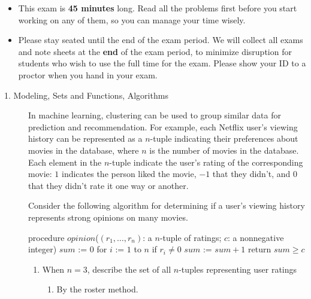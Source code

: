 \documentclass[12pt, oneside]{article}
\newif \ifsolution
\newcommand{\sol}[1]{\medskip\fbox{\begin{minipage}{5.5in}{#1}\end{minipage}}\medskip}
\begin{document}
\begin{center}
\begin{minipage}[t]{7in}
\begin{itemize}
  \item This exam is {\bf 45 minutes} long. Read all the problems first before you start 
  working on any of them, so you can manage your time wisely.
  
  \item Please stay seated until the end of the exam period.
  We will collect all exams and note sheets at the {\bf end} of the exam period, to minimize disruption 
  for students who wish to use the full time for the exam. Please show your ID to a proctor when you hand 
  in your exam. 
  
  
  \end{itemize}
  \end{minipage} \hfill
  \end{center}
  \newpage
\fi

\begin{description}

\item[1. Modeling, Sets and Functions, Algorithms] 
In machine learning, clustering can be used to group similar data for prediction and recommendation.  For example,
each Netflix user's viewing history can be represented as a $n$-tuple indicating their preferences about
movies in the database, where $n$ is the number of movies in the database.  Each element in the $n$-tuple indicate
the user's rating of the corresponding movie: 
$1$ indicates the person liked the movie, $-1$
that they didn't, and $0$ that they didn't rate it one way or another.

Consider the following algorithm for determining if a user's viewing history represents
strong opinions on many movies.
\begin{algorithm}[caption={Determine if user's ratings tuple encode strong opinions}]
procedure $\textit{opinion}$($(r_1, \ldots, r_n)$: a $n$-tuple of ratings; $c$: a nonnegative integer)
$sum$ := $0$
for $i$ := $1$ to $n$
  if $r_i \neq 0$
    $sum$ := $sum + 1$
return $sum \geq c$
\end{algorithm}

  \begin{enumerate}\item When $n = 3$, describe the set of all $n$-tuples representing user ratings
  \begin{enumerate}\item By the roster method.
  
  \ifsolution{
  \sol{There are 27 $3$-tuples whose elements are each $-1$, $0$, or $1$.  We can list them as follows.
  \begin{align*}
  \{ & (-1, -1, -1) , (-1, -1, 0) , (-1, -1, 1) , (-1, 0, -1), (-1, 0, 0), (-1, 0, 1),\\
     & (-1, 1, -1), (-1, 1, 0), (-1, 1, 1), (0, -1, -1) , (0, -1, 0) , (0, -1, 1) , \\
     & (0, 0, -1), (0, 0, 0), (0, 0, 1), (0, 1, -1), (0, 1, 0), (0, 1, 1), (1, -1, -1) , \\
     & (1, -1, 0) , (1, -1, 1) , (1, 0, -1), (1, 0, 0), (1, 0, 1), (1, 1, -1), (1, 1, 0), (1, 1, 1) \}  
  \end{align*}
  }}\fi
  

\end{enumerate}
\end{enumerate}
\end{description}
\end{document}

